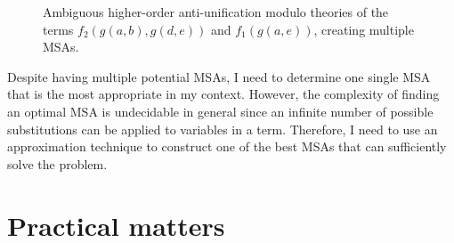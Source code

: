 \begin{figure}[t]
\centering{}
\vspace*{1em}

\centering{}
\caption[Ambiguous higher-order anti-unification modulo theories of two terms.]{Ambiguous higher-order anti-unification modulo theories of the terms $f_2(g(a,b), g(d,e))$
and $f_1(g(a,e))$, creating multiple MSAs.}
  \label{fig:multipleMSA}
\end{figure}


Despite having multiple potential MSAs, I need to determine one single MSA that is the most appropriate in my context. However, the complexity of finding an optimal MSA is undecidable in general \cite{2008:fse:cottrell} since an infinite number of possible substitutions can be applied to variables in a term. Therefore, I need to use an approximation technique to construct one of the best MSAs that can sufficiently solve the problem.

\section{Practical matters}

